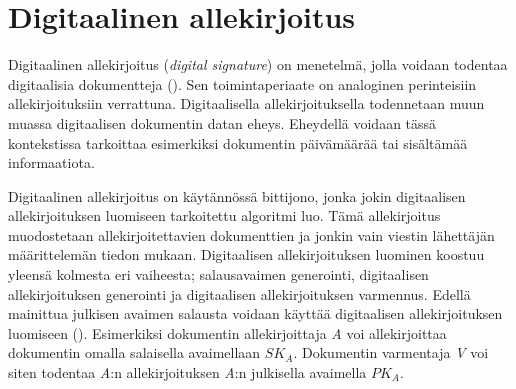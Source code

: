  \section{Digitaalinen allekirjoitus}
 Digitaalinen allekirjoitus (\emph{digital signature}) on menetelmä, jolla voidaan todentaa digitaalisia dokumentteja (\cite{1649003}). Sen toimintaperiaate on analoginen perinteisiin allekirjoituksiin verrattuna. Digitaalisella allekirjoituksella todennetaan muun muassa digitaalisen dokumentin datan eheys. Eheydellä voidaan tässä kontekstissa tarkoittaa esimerkiksi dokumentin päivämäärää tai sisältämää informaatiota.
 
 Digitaalinen allekirjoitus on käytännössä bittijono, jonka jokin digitaalisen allekirjoituksen luomiseen tarkoitettu algoritmi luo. Tämä allekirjoitus muodostetaan allekirjoitettavien dokumenttien ja jonkin vain viestin lähettäjän määrittelemän tiedon mukaan. Digitaalisen allekirjoituksen luominen koostuu yleensä kolmesta eri vaiheesta; salausavaimen generointi, digitaalisen allekirjoituksen generointi ja digitaalisen allekirjoituksen varmennus. Edellä mainittua julkisen avaimen salausta voidaan käyttää digitaalisen allekirjoituksen luomiseen (\cite{mavroeidis2018impact}). Esimerkiksi dokumentin allekirjoittaja \emph{A} voi allekirjoittaa dokumentin omalla salaisella avaimellaan $SK_{A}$. Dokumentin varmentaja \emph{V} voi siten todentaa \emph{A}:n allekirjoituksen \emph{A}:n julkisella avaimella $PK_{A}$.